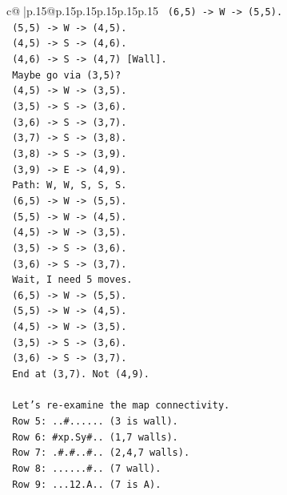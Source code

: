 \documentclass{article}
\begin{document}
{\begin{supertabular}{c@{$\;$}|p{.15\linewidth}@{}p{.15\linewidth}p{.15\linewidth}p{.15\linewidth}p{.15\linewidth}p{.15\linewidth}}
{{{\texttt{      (6,5) {-}> W {-}> (5,5).} \\
\texttt{      (5,5) {-}> W {-}> (4,5).} \\
\texttt{      (4,5) {-}> S {-}> (4,6).} \\
\texttt{      (4,6) {-}> S {-}> (4,7) {[}Wall{]}.} \\
\texttt{      Maybe go via (3,5)?} \\
\texttt{      (4,5) {-}> W {-}> (3,5).} \\
\texttt{      (3,5) {-}> S {-}> (3,6).} \\
\texttt{      (3,6) {-}> S {-}> (3,7).} \\
\texttt{      (3,7) {-}> S {-}> (3,8).} \\
\texttt{      (3,8) {-}> S {-}> (3,9).} \\
\texttt{      (3,9) {-}> E {-}> (4,9).} \\
\texttt{      Path: W, W, S, S, S.} \\
\texttt{      (6,5) {-}> W {-}> (5,5).} \\
\texttt{      (5,5) {-}> W {-}> (4,5).} \\
\texttt{      (4,5) {-}> W {-}> (3,5).} \\
\texttt{      (3,5) {-}> S {-}> (3,6).} \\
\texttt{      (3,6) {-}> S {-}> (3,7).} \\
\texttt{      Wait, I need 5 moves.} \\
\texttt{      (6,5) {-}> W {-}> (5,5).} \\
\texttt{      (5,5) {-}> W {-}> (4,5).} \\
\texttt{      (4,5) {-}> W {-}> (3,5).} \\
\texttt{      (3,5) {-}> S {-}> (3,6).} \\
\texttt{      (3,6) {-}> S {-}> (3,7).} \\
\texttt{      End at (3,7). Not (4,9).} \\
\\ 
\texttt{      Let's re{-}examine the map connectivity.} \\
\texttt{      Row 5: ..\#...... (3 is wall).} \\
\texttt{      Row 6: \#xp.Sy\#.. (1,7 walls).} \\
\texttt{      Row 7: .\#.\#..\#.. (2,4,7 walls).} \\
\texttt{      Row 8: ......\#.. (7 wall).} \\
\texttt{      Row 9: ...12.A.. (7 is A).} \\
\\ 
}}}
\end{supertabular}}
\end{document}
